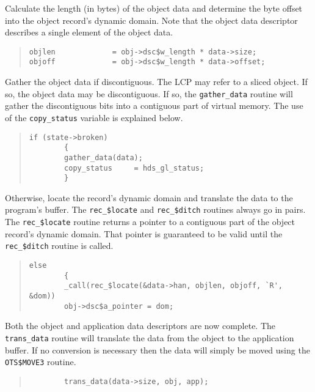 Calculate the length (in bytes) of the object data and determine the byte
offset into the object record's dynamic domain. Note that the object data
descriptor describes a single element of the object data.

\begin {quote}
\begin {verbatim}
objlen             = obj->dsc$w_length * data->size;
objoff             = obj->dsc$w_length * data->offset;
\end{verbatim}
\end {quote}

Gather the object data if discontiguous. The LCP may refer to a sliced object.
If so, the object data may be discontiguous. If so, the {\tt gather\_data}
routine will gather the discontiguous bits into a contiguous part of virtual
memory. The use of the {\tt copy\_status} variable is explained below.

\begin {quote}
\begin {verbatim}
if (state->broken)
        {
        gather_data(data);
        copy_status     = hds_gl_status;
        }
\end{verbatim}
\end {quote}

Otherwise, locate the record's dynamic domain and translate the data to the
program's buffer. The {\tt rec\_\$locate} and {\tt rec\_\$ditch} routines
always go in pairs. The {\tt rec\_\$locate} routine returns a pointer to a
contiguous part of the object record's dynamic domain. That pointer is
guaranteed to be valid until the {\tt rec\_\$ditch} routine is called.

\begin {quote}
\begin {verbatim}
else
        {
        _call(rec_$locate(&data->han, objlen, objoff, `R', &dom))
        obj->dsc$a_pointer = dom;
\end{verbatim}
\end {quote}

Both the object and application data descriptors are now complete. The {\tt
trans\_data} routine will translate the data from the object to the application
buffer. If no conversion is necessary then the data will simply be moved using
the {\tt OTS\$MOVE3} routine.

\begin {quote}
\begin {verbatim}
        trans_data(data->size, obj, app);
\end{verbatim}
\end {quote}

